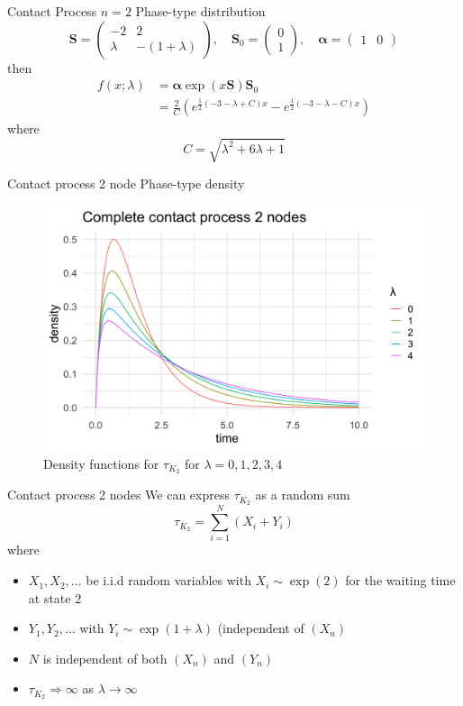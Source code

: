 \documentclass{beamer}
\theoremstyle{definition}
\begin{document}
\begin{frame}{Contact Process $n = 2$ Phase-type distribution}
$$
    \mathbf{S} = \begin{pmatrix}
        -2 & 2\\
        \lambda & - (1 + \lambda)
    \end{pmatrix}, \quad
    \mathbf{S}_0 = \begin{pmatrix}
        0\\
        1
    \end{pmatrix}, \quad
    \boldsymbol{\alpha} = \begin{pmatrix}
    1 & 0
    \end{pmatrix}
$$
then
\begin{align*}
 f(x; \lambda) &= \boldsymbol{\alpha} \exp(x \mathbf{S}) \mathbf{S}_0\\
 &= \frac{2}{C} \left( e^{\frac{1}{2}(-3 - \lambda + C) x} - e^{\frac{1}{2}(-3 - \lambda - C) x} \right)
\end{align*}
where
$$
C = \sqrt{\lambda^2 + 6 \lambda + 1}
$$
\end{frame}

\begin{frame}{Contact process 2 node Phase-type density}
\begin{figure}[H]
  \centering
    \includegraphics[width=.80\textwidth]{figures/complete_2_contact_phase_densities.png}
   \caption{Density functions for $\tau_{K_2}$ for $\lambda = 0, 1, 2, 3, 4$}
  \label{fig:contact_2_phase_densities}
\end{figure}
\end{frame}

\begin{frame}{Contact process 2 nodes}
We can express $\tau_{K_2}$ as a random sum
$$
\tau_{K_2} = \sum_{i = 1}^N (X_i + Y_i)
$$
where 
\begin{itemize}
    \item $X_1, X_2, \ldots$ be i.i.d random variables with
$X_i \sim \exp(2)$ for the waiting time at state 2
    \item $Y_1, Y_2, \ldots$ with  $Y_i \sim \exp(1 + \lambda)$ (independent of $(X_n)$
    \item $N$ is independent of both $(X_n)$ and $(Y_n)$
    \item $\tau_{K_2} \Rightarrow \infty$ as $\lambda \to \infty$
\end{itemize}
\end{frame}
\end{document}
